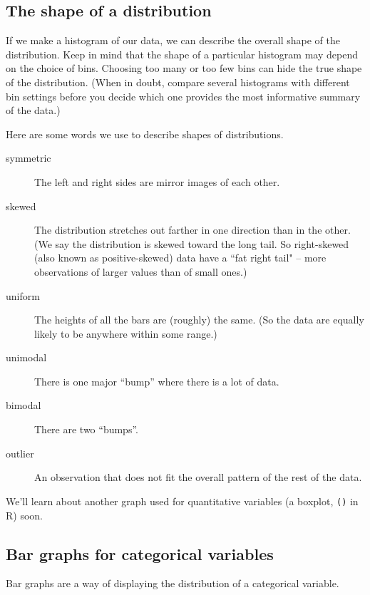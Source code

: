 \documentclass[twoside]{book}\usepackage[]{graphicx}\usepackage[]{xcolor}
\newcommand{\Rindex}[1]{\index{\texttt{#1}}}
\newcommand{\function}[1]{{\color{purple!75!blue}\texttt{\StrSubstitute{#1}{()}{}()}}\Rindex{#1}}
\def\R{{\sf R}}
\begin{document}
\subsection{The shape of a distribution}

If we make a histogram of our data, we can describe the overall shape of the distribution.
Keep in mind that the shape of a particular histogram may depend on the choice of bins.
Choosing too many or too few bins can hide the true shape of the distribution.  (When in doubt, compare several
histograms with different bin settings before you decide which one provides the most informative
summary of the data.)

Here are some words we use to describe shapes of distributions.
\begin{description}
\item[symmetric] The left and right sides are mirror images of each other.
\item[skewed] The distribution stretches out farther in one direction than in the other.  
(We say the distribution is skewed toward the long tail. So right-skewed 
(also known as positive-skewed)
data have a ``fat right tail" -- more observations of larger values than of small ones.)
\item[uniform] The heights of all the bars are (roughly) the same.  
(So the data are equally likely to be anywhere within some range.)
\item[unimodal] There is one major ``bump'' where there is a lot of data.
\item[bimodal] There are two ``bumps''.
\item[outlier] An observation that does not fit the overall pattern of the rest of 
the data.
\end{description}



We'll learn about another graph used for quantitative variables 
(a boxplot, \function{bwplot()} in \R) soon.

\subsection{Bar graphs for categorical variables}

Bar graphs are a way of displaying the distribution of a categorical variable.
\end{document}

